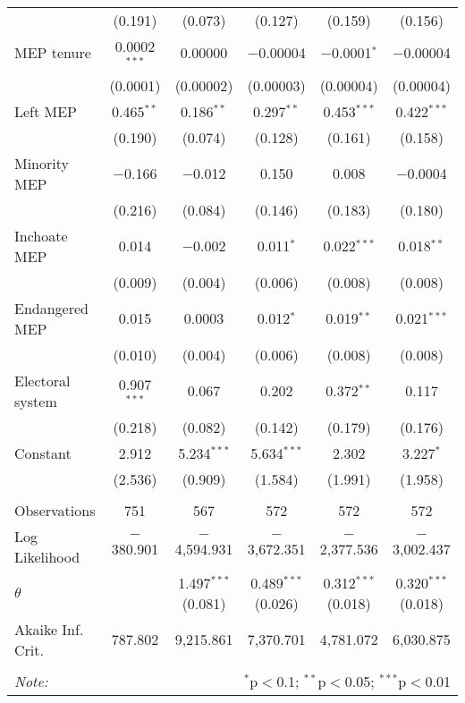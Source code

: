 \documentclass[12pt]{article}\usepackage[]{graphicx}\usepackage[]{color}
\begin{document}
\begin{landscape}
\begin{table}[!htbp]
\begin{tabular}{@{\extracolsep{5pt}}lccccc}
  & (0.191) & (0.073) & (0.127) & (0.159) & (0.156) \\ 
  MEP tenure & 0.0002$^{***}$ & 0.00000 & $-$0.00004 & $-$0.0001$^{*}$ & $-$0.00004 \\ 
  & (0.0001) & (0.00002) & (0.00003) & (0.00004) & (0.00004) \\ 
  Left MEP & 0.465$^{**}$ & 0.186$^{**}$ & 0.297$^{**}$ & 0.453$^{***}$ & 0.422$^{***}$ \\ 
  & (0.190) & (0.074) & (0.128) & (0.161) & (0.158) \\ 
  Minority MEP & $-$0.166 & $-$0.012 & 0.150 & 0.008 & $-$0.0004 \\ 
  & (0.216) & (0.084) & (0.146) & (0.183) & (0.180) \\ 
  Inchoate MEP & 0.014 & $-$0.002 & 0.011$^{*}$ & 0.022$^{***}$ & 0.018$^{**}$ \\ 
  & (0.009) & (0.004) & (0.006) & (0.008) & (0.008) \\ 
  Endangered MEP & 0.015 & 0.0003 & 0.012$^{*}$ & 0.019$^{**}$ & 0.021$^{***}$ \\ 
  & (0.010) & (0.004) & (0.006) & (0.008) & (0.008) \\ 
  Electoral system & 0.907$^{***}$ & 0.067 & 0.202 & 0.372$^{**}$ & 0.117 \\ 
  & (0.218) & (0.082) & (0.142) & (0.179) & (0.176) \\ 
  Constant & 2.912 & 5.234$^{***}$ & 5.634$^{***}$ & 2.302 & 3.227$^{*}$ \\ 
  & (2.536) & (0.909) & (1.584) & (1.991) & (1.958) \\ 
 \hline \\[-1.8ex] 
Observations & 751 & 567 & 572 & 572 & 572 \\ 
Log Likelihood & $-$380.901 & $-$4,594.931 & $-$3,672.351 & $-$2,377.536 & $-$3,002.437 \\ 
$\theta$ &  & 1.497$^{***}$  (0.081) & 0.489$^{***}$  (0.026) & 0.312$^{***}$  (0.018) & 0.320$^{***}$  (0.018) \\ 
Akaike Inf. Crit. & 787.802 & 9,215.861 & 7,370.701 & 4,781.072 & 6,030.875 \\ 
\hline 
\hline \\[-1.8ex] 
\textit{Note:}  & \multicolumn{5}{r}{$^{*}$p$<$0.1; $^{**}$p$<$0.05; $^{***}$p$<$0.01} \\ 
\end{tabular} 
\end{table} 

\end{landscape}

\clearpage


\end{document}
